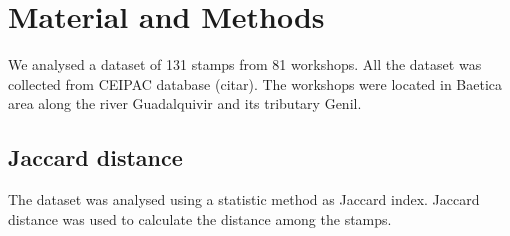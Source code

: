 \documentclass[review]{elsarticle}
\begin{document}
\section{Material and Methods}

We analysed a dataset of 131 stamps from 81 workshops. All the dataset was collected from CEIPAC database (citar). The workshops were located in Baetica area along the river Guadalquivir and its tributary Genil. 

\subsection{Jaccard distance}

The dataset was analysed using a statistic method as Jaccard index. Jaccard distance was used to calculate the distance among the stamps. 
\end{document}
